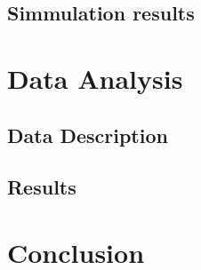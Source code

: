 \documentclass[12pt,a4paper,bibliography=totocnumbered,listof=totocnumbered]{scrartcl}
\begin{document}
\subsection{Simmulation results}



\section{Data Analysis}

\subsection{Data Description}

\subsection{Results}


\section{Conclusion}

\pagebreak

\renewcommand\refname{List of Literature}






\pagebreak

\rhead{}
\setcounter{page}{1}
\end{document}
